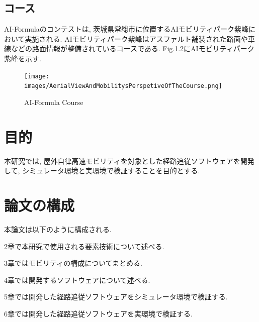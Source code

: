 
\subsection{コース}
AI-Formulaのコンテストは, 茨城県常総市に位置するAIモビリティパーク紫峰において実施される.
AIモビリティパーク紫峰はアスファルト舗装された路面や車線などの路面情報が整備されているコースである.
Fig.1.2にAIモビリティパーク紫峰を示す.

\begin{figure}[H]
  \centering
 \texttt{[image: images/AerialViewAndMobilitysPerspetiveOfTheCourse.png]}
 \caption{AI-Formula Course}
 \label{fig:course}
\end{figure}


\section{目的}
本研究では, 屋外自律高速モビリティを対象とした経路追従ソフトウェアを開発して, シミュレータ環境と実環境で検証することを目的とする.


\section{論文の構成}
本論文は以下のように構成される.

2章で本研究で使用される要素技術について述べる.

3章ではモビリティの構成についてまとめる.

4章では開発するソフトウェアについて述べる.

5章では開発した経路追従ソフトウェアをシミュレータ環境で検証する.

6章では開発した経路追従ソフトウェアを実環境で検証する.

\newpage
